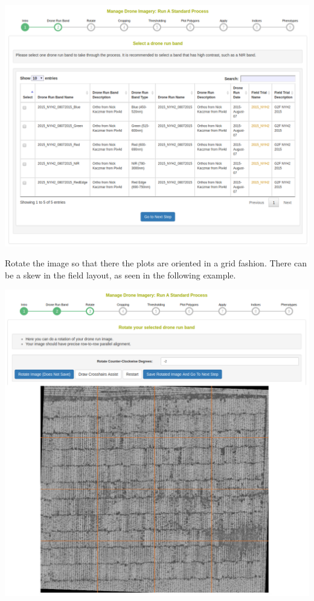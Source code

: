 \documentclass[
  12pt,
]{book}
\begin{document}
\begin{center}\includegraphics[width=0.95\linewidth]{assets/images/manage_image_phenotyping_standard_process_drone_run_band} \end{center}

Rotate the image so that there the plots are oriented in a grid fashion. There can be a skew in the field layout, as seen in the following example.

\begin{center}\includegraphics[width=0.95\linewidth]{assets/images/manage_image_phenotyping_standard_process_rotate} \end{center}
\end{document}
